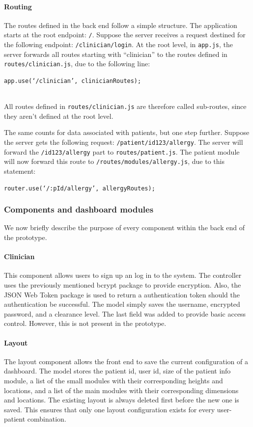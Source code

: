         \paragraph{Routing} The routes defined in the back end follow a simple structure. The application starts at the root endpoint: \texttt{/}. Suppose the server receives a request destined for the following endpoint: \texttt{/clinician/login}. At the root level, in \texttt{app.js}, the server forwards all routes starting with ``clinician'' to the routes defined in \texttt{routes/clinician.js}, due to the following line:\\
        \centerline{\texttt{app.use(`/clinician', clinicianRoutes);}}\\ %
        All routes defined in \texttt{routes/clinician.js} are therefore called sub-routes, since they aren't defined at the root level.\medskip

        \noindent The same counts for data associated with patients, but one step further. Suppose the server gets the following request: \texttt{/patient/id123/allergy}. The server will forward the \texttt{/id123/allergy} part to \texttt{routes/patient.js}. The patient module will now forward this route to \texttt{/routes/modules/allergy.js}, due to this statement:\\
        \centerline{\texttt{router.use(`/:pId/allergy', allergyRoutes);}} %
        
        \subsubsection{Components and dashboard modules}

        We now briefly describe the purpose of every component within the back end of the prototype.

            \paragraph{Clinician} This component allows users to sign up an log in to the system. The controller uses the previously mentioned bcrypt package to provide encryption. Also, the JSON Web Token package is used to return a authentication token should the authentication be successful. The model simply saves the username, encrypted password, and a clearance level. The last field was added to provide basic access control. However, this is not present in the prototype.

            \paragraph{Layout} The layout component allows the front end to save the current configuration of a dashboard. The model stores the patient id, user id, size of the patient info module, a list of the small modules with their corresponding heights and locations, and a list of the main modules with their corresponding dimensions and locations. The existing layout is always deleted first before the new one is saved. This ensures that only one layout configuration exists for every user-patient combination.

